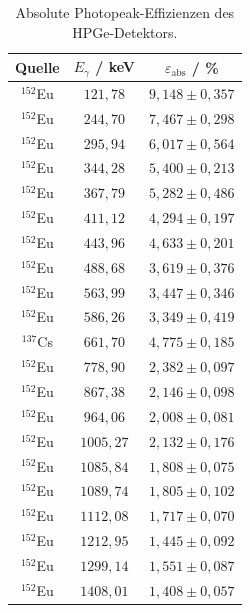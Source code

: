 \begin{table}[H]
\centering
\caption{Absolute Photopeak-Effizienzen des HPGe-Detektors.}
\label{tab:effizienz_hpge}
\begin{tabular}{ccc}
\toprule
Quelle & $E_\gamma$ / keV & $\varepsilon_{\mathrm{abs}}$ / \% \\
\midrule
$^{152}$Eu & $121,78$  & $9,148 \pm 0,357$ \\
$^{152}$Eu & $244,70$  & $7,467 \pm 0,298$ \\
$^{152}$Eu & $295,94$  & $6,017 \pm 0,564$ \\
$^{152}$Eu & $344,28$  & $5,400 \pm 0,213$ \\
$^{152}$Eu & $367,79$  & $5,282 \pm 0,486$ \\
$^{152}$Eu & $411,12$  & $4,294 \pm 0,197$ \\
$^{152}$Eu & $443,96$  & $4,633 \pm 0,201$ \\
$^{152}$Eu & $488,68$  & $3,619 \pm 0,376$ \\
$^{152}$Eu & $563,99$  & $3,447 \pm 0,346$ \\
$^{152}$Eu & $586,26$  & $3,349 \pm 0,419$ \\
$^{137}$Cs & $661,70$  & $4,775 \pm 0,185$ \\
$^{152}$Eu & $778,90$  & $2,382 \pm 0,097$ \\
$^{152}$Eu & $867,38$  & $2,146 \pm 0,098$ \\
$^{152}$Eu & $964,06$  & $2,008 \pm 0,081$ \\
$^{152}$Eu & $1005,27$ & $2,132 \pm 0,176$ \\
$^{152}$Eu & $1085,84$ & $1,808 \pm 0,075$ \\
$^{152}$Eu & $1089,74$ & $1,805 \pm 0,102$ \\
$^{152}$Eu & $1112,08$ & $1,717 \pm 0,070$ \\
$^{152}$Eu & $1212,95$ & $1,445 \pm 0,092$ \\
$^{152}$Eu & $1299,14$ & $1,551 \pm 0,087$ \\
$^{152}$Eu & $1408,01$ & $1,408 \pm 0,057$ \\
\bottomrule
\end{tabular}
\end{table}

